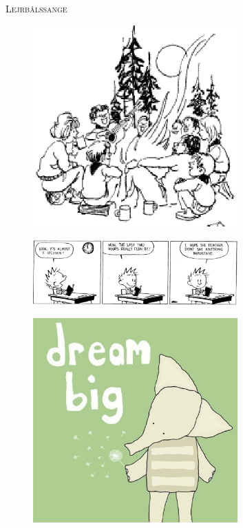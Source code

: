 \begin{center}
{\Huge\textsc{Lejrbålssange}}
\end{center}
\begin{figure}[h!]
  \centering
    \includegraphics[width=0.7\textwidth]{images/lejrbaal.eps}
\end{figure}
\newpage


\newpage

\newpage

\newpage


\newpage


\newpage

\begin{figure}[hb!]
  \centering
    \includegraphics[width=0.7\textwidth]{images/calvinandhobbes.eps}
\end{figure}
\newpage


\newpage

\newpage

\begin{figure}[h!]
  \centering
    \includegraphics[width=0.7\textwidth]{images/dream.eps}
\end{figure}
\newpage

